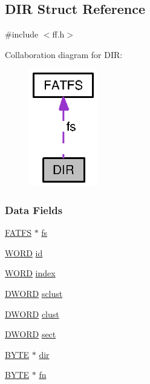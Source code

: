 \subsection{D\+I\+R Struct Reference}
\label{struct_d_i_r}


{\ttfamily \#include $<$ff.\+h$>$}



Collaboration diagram for D\+I\+R\+:
\nopagebreak
\begin{figure}[H]
\begin{center}
\leavevmode
\includegraphics[width=85pt]{struct_d_i_r__coll__graph}
\end{center}
\end{figure}
\subsubsection*{Data Fields}
\begin{DoxyCompactItemize}
\item 
\hyperlink{struct_f_a_t_f_s}{F\+A\+T\+F\+S} $\ast$ \hyperlink{struct_d_i_r_a312eaa66cb703fb2993ea98173dc0c9a}{fs}
\item 
\hyperlink{integer_8h_a197942eefa7db30960ae396d68339b97}{W\+O\+R\+D} \hyperlink{struct_d_i_r_aca2c95a99a04173917ec70c030891383}{id}
\item 
\hyperlink{integer_8h_a197942eefa7db30960ae396d68339b97}{W\+O\+R\+D} \hyperlink{struct_d_i_r_ab95119fbacbe45e3e9ee0f962b844092}{index}
\item 
\hyperlink{integer_8h_ad342ac907eb044443153a22f964bf0af}{D\+W\+O\+R\+D} \hyperlink{struct_d_i_r_a9212af5877b94d790dd3bab3aa320994}{sclust}
\item 
\hyperlink{integer_8h_ad342ac907eb044443153a22f964bf0af}{D\+W\+O\+R\+D} \hyperlink{struct_d_i_r_acfbb8ba2d6e73b6f999ceffd1857c190}{clust}
\item 
\hyperlink{integer_8h_ad342ac907eb044443153a22f964bf0af}{D\+W\+O\+R\+D} \hyperlink{struct_d_i_r_ad01fcc812ed0dad11a593574336adc9e}{sect}
\item 
\hyperlink{integer_8h_a4ae1dab0fb4b072a66584546209e7d58}{B\+Y\+T\+E} $\ast$ \hyperlink{struct_d_i_r_a6c2a8c0cf2d55ae99775e93a16593449}{dir}
\item 
\hyperlink{integer_8h_a4ae1dab0fb4b072a66584546209e7d58}{B\+Y\+T\+E} $\ast$ \hyperlink{struct_d_i_r_a32da2f31d6c3b6c42eef981cb0cfd2ee}{fn}
\end{DoxyCompactItemize}



